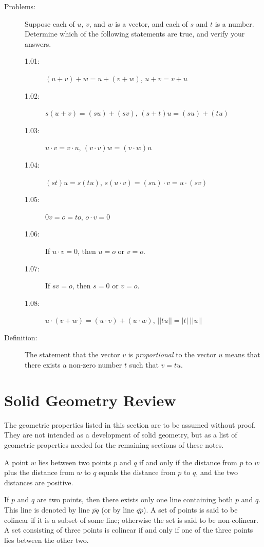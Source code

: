 \documentclass{article}
\begin{document}
\begin{description}
 \item[Problems:] Suppose each of $u$, $v$, and $w$ is a vector, and each of $s$ and $t$ is a number. Determine which of the following statements are true, and verify your answers.
    \begin{description}
      \item[1.01:] $(u+v)+w = u+(v+w)$, \quad $u+v = v+u$
      \item[1.02:] $s(u+v) = (su)+(sv)$, \quad $(s+t)u = (su)+(tu)$
      \item[1.03:] $u \cdot v = v\cdot u$, \quad $(v \cdot v)w = (v \cdot w)u$
      \item[1.04:] $(st)u = s(tu)$, \quad $s(u \cdot v) = (su) \cdot v = u \cdot (sv)$
      \item[1.05:] $0v = o = to$, \quad $o \cdot v = 0$
      \item[1.06:] If $u \cdot v = 0$, then $u=o$ or $v=o$.
      \item[1.07:] If $sv=o$, then $s=0$ or $v=o$.
      \item[1.08:] $u \cdot (v+w) = (u \cdot v)+(u \cdot w)$, \quad $\vert \vert tu \vert \vert = \vert t \vert \ \vert \vert u \vert \vert$
    \end{description}

  \item[Definition:] The statement that the vector $v$ is \emph{proportional} to the vector $u$ means that there exists a non-zero number $t$ such that $v=tu$.

\end{description}


\section*{Solid Geometry Review}

The geometric properties listed in this section are to be assumed without proof. They are not intended as a development of solid geometry, but as a list of geometric properties needed for the remaining sections of these notes.

A point $w$ lies between two points $p$ and $q$ if and only if the distance from $p$ to $w$ plus the distance from $w$ to $q$ equals the distance from $p$ to $q$, and the two distances are positive.

If $p$ and $q$ are two points, then there exists only one line containing both $p$ and $q$. This line is denoted by line $\overline{pq}$ (or by line $\overline{qp}$). A set of points is said to be colinear if it is a subset of some line; otherwise the set is said to be non-colinear. A set consisting of three points is colinear if and only if one of the three points lies between the other two.
\end{document}
